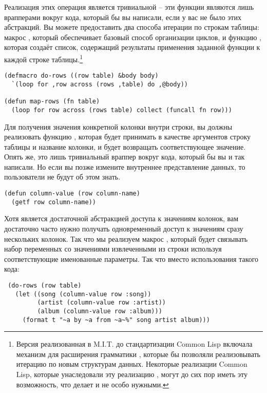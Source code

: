 Реализация этих операция является тривиальной -- эти функции являются лишь врапперами
вокруг кода, который бы вы написали, если у вас не было этих абстракций.  Вы можете
предоставить два способа итерации по строкам таблицы: макрос , который
обеспечивает базовый способ организации циклов, и функцию , которая создаёт
список, содержащий результаты применения заданной функции к каждой строке
таблицы.\footnote{Версия  реализованная в M.I.T. до стандартизации Common Lisp
  включала механизм для расширения грамматики , которые бы позволяли
  реализовывать итерацию по новым структурам данных.  Некоторые реализации Common Lisp,
  которые унаследовали эту реализацию , могут до сих пор иметь эту возможность,
  что делает  и  не особо нужными.}

\begin{lstlisting}
(defmacro do-rows ((row table) &body body)
  `(loop for ,row across (rows ,table) do ,@body))

(defun map-rows (fn table)
  (loop for row across (rows table) collect (funcall fn row)))
\end{lstlisting}

Для получения значения конкретной колонки внутри строки, вы должны реализовать функцию
, которая будет принимать в качестве аргументов строку таблицы и
название колонки, и будет возвращать соответствующее значение.  Опять же, это лишь
тривиальный враппер вокруг кода, который бы вы и так написали.  Но если вы позже измените
внутреннее представление данных, то пользователи  не будут об этом
знать.

\begin{lstlisting}
(defun column-value (row column-name)
  (getf row column-name))
\end{lstlisting}

Хотя  является достаточной абстракцией доступа к значениям колонок, вам
достаточно часто нужно получать одновременный доступ к значениям сразу нескольких колонок.
Так что мы реализуем макрос , который будет связывать набор
переменных со значениями извлеченными из строки используя соответствующие именованные
параметры.  Так что вместо использования такого кода:

\begin{lstlisting}
 (do-rows (row table)
   (let ((song (column-value row :song))
         (artist (column-value row :artist))
         (album (column-value row :album)))
     (format t "~a by ~a from ~a~%" song artist album)))
\end{lstlisting}

